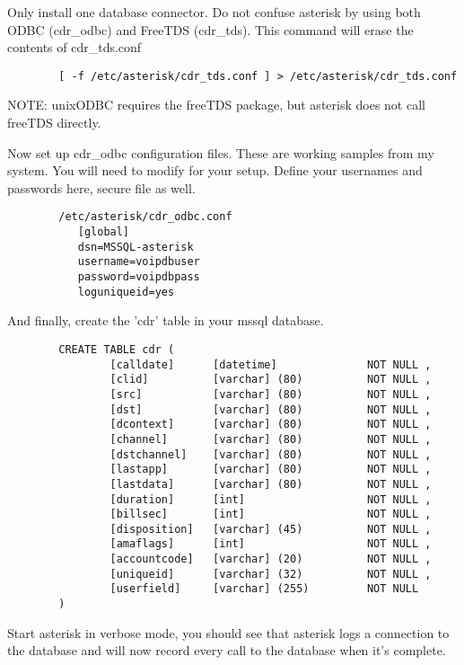 		Only install one database connector.  Do not confuse asterisk
		by using both ODBC (cdr\_odbc) and FreeTDS (cdr\_tds).
		This command will erase the contents of cdr\_tds.conf 
\begin{verbatim}
		[ -f /etc/asterisk/cdr_tds.conf ] > /etc/asterisk/cdr_tds.conf
\end{verbatim}
		NOTE:  unixODBC requires the freeTDS package, but asterisk does
		not call freeTDS directly.

		Now set up cdr\_odbc configuration files.  These are working samples
		from my system.  You will need to modify for your setup. Define
		your usernames and passwords here, secure file as well.
\begin{verbatim}
		/etc/asterisk/cdr_odbc.conf
		   [global]
		   dsn=MSSQL-asterisk
		   username=voipdbuser
		   password=voipdbpass
		   loguniqueid=yes
\end{verbatim}
		And finally, create the 'cdr' table in your mssql database.
\begin{verbatim}
		CREATE TABLE cdr ( 
		        [calldate]      [datetime]              NOT NULL ,
		        [clid]          [varchar] (80)          NOT NULL ,
		        [src]           [varchar] (80)          NOT NULL ,
		        [dst]           [varchar] (80)          NOT NULL ,
		        [dcontext]      [varchar] (80)          NOT NULL ,
		        [channel]       [varchar] (80)          NOT NULL ,
		        [dstchannel]    [varchar] (80)          NOT NULL ,
		        [lastapp]       [varchar] (80)          NOT NULL ,
		        [lastdata]      [varchar] (80)          NOT NULL ,
		        [duration]      [int]                   NOT NULL ,
		        [billsec]       [int]                   NOT NULL ,
		        [disposition]   [varchar] (45)          NOT NULL ,
		        [amaflags]      [int]                   NOT NULL ,
		        [accountcode]   [varchar] (20)          NOT NULL ,
		        [uniqueid]      [varchar] (32)          NOT NULL ,
		        [userfield]     [varchar] (255)         NOT NULL
		)
\end{verbatim}
		Start asterisk in verbose mode, you should see that asterisk
		logs a connection to the database and will now record every
		call to the database when it's complete.


